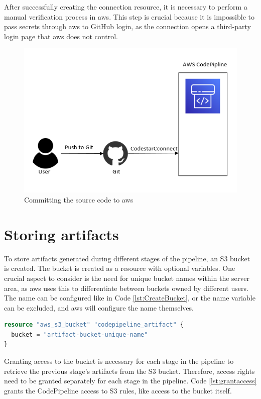 After successfully creating the connection resource, it is necessary to perform a manual verification process in \acrshort{aws}. This step is crucial because it is impossible to pass secrets through \acrshort{aws} to GitHub login, as the connection opens a third-party login page that \acrshort{aws} does not control.

\vspace{2mm}
\begin{figure}[H]
    \centering
    \includegraphics[width=0.6\columnwidth]{Images/aws-piplin-2-1.png}
    \caption{Committing the source code to \acrshort{aws}}
    \label{fig: Committing the source code to AWS}
\end{figure}

\section{Storing artifacts}
To store \gls{artifact}s generated during different stages of the pipeline, an S3 bucket is created. The bucket is created as a resource with optional variables. One crucial aspect to consider is the need for unique bucket names within the server area, as \acrshort{aws} uses this to differentiate between buckets owned by different users. The name can be configured like in Code \ref{lst:CreateBucket}, or the name variable can be excluded, and \acrshort{aws} will configure the name themselves.

\vspace{2mm}
\begin{lstlisting}[language=terraform, caption=Create an S3 Bucket, captionpos=b, frame=single, label=lst:CreateBucket]
resource "aws_s3_bucket" "codepipeline_artifact" {
  bucket = "artifact-bucket-unique-name"
}
\end{lstlisting}

Granting access to the bucket is necessary for each stage in the pipeline to retrieve the previous stage's artifacts from the S3 bucket. Therefore, access rights need to be granted separately for each stage in the pipeline. Code \ref{lst:grantaccess} grants the CodePipeline access to S3 rules, like access to the bucket itself. 


